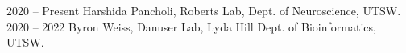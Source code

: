 2020 -- Present \hspace{14pt} Harshida Pancholi, Roberts Lab, Dept. of Neuroscience, UTSW. \\
2020 -- 2022 \hspace{28pt} Byron Weiss, Danuser Lab, Lyda Hill Dept. of Bioinformatics, UTSW. \\
